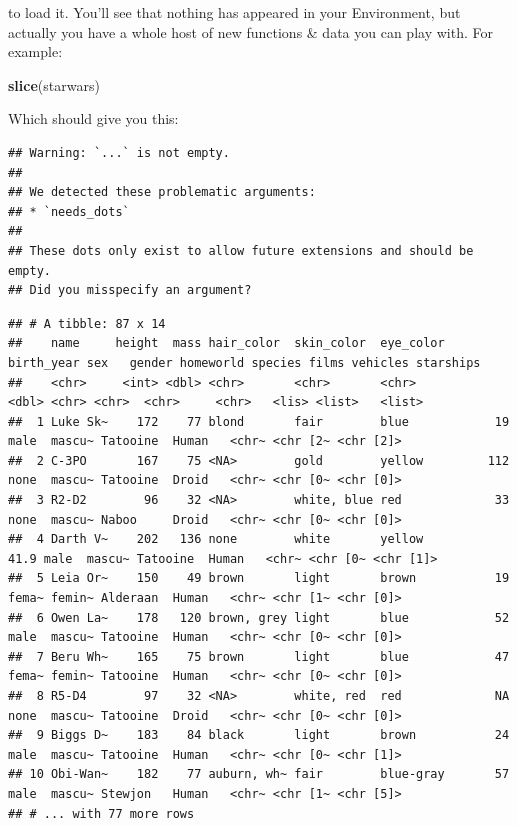 \documentclass[
]{book}
\newenvironment{Shaded}{\begin{snugshade}}{\end{snugshade}}
\newcommand{\KeywordTok}[1]{\textcolor[rgb]{0.13,0.29,0.53}{\textbf{#1}}}
\newcommand{\NormalTok}[1]{#1}
\begin{document}
to load it. You'll see that nothing has appeared in your Environment, but actually you have a whole host of new functions \& data you can play with. For example:

\begin{Shaded}
\begin{Highlighting}[]
\KeywordTok{slice}\NormalTok{(starwars)}
\end{Highlighting}
\end{Shaded}

Which should give you this:

\begin{verbatim}
## Warning: `...` is not empty.
## 
## We detected these problematic arguments:
## * `needs_dots`
## 
## These dots only exist to allow future extensions and should be empty.
## Did you misspecify an argument?
\end{verbatim}

\begin{verbatim}
## # A tibble: 87 x 14
##    name     height  mass hair_color  skin_color  eye_color birth_year sex   gender homeworld species films vehicles starships
##    <chr>     <int> <dbl> <chr>       <chr>       <chr>          <dbl> <chr> <chr>  <chr>     <chr>   <lis> <list>   <list>   
##  1 Luke Sk~    172    77 blond       fair        blue            19   male  mascu~ Tatooine  Human   <chr~ <chr [2~ <chr [2]>
##  2 C-3PO       167    75 <NA>        gold        yellow         112   none  mascu~ Tatooine  Droid   <chr~ <chr [0~ <chr [0]>
##  3 R2-D2        96    32 <NA>        white, blue red             33   none  mascu~ Naboo     Droid   <chr~ <chr [0~ <chr [0]>
##  4 Darth V~    202   136 none        white       yellow          41.9 male  mascu~ Tatooine  Human   <chr~ <chr [0~ <chr [1]>
##  5 Leia Or~    150    49 brown       light       brown           19   fema~ femin~ Alderaan  Human   <chr~ <chr [1~ <chr [0]>
##  6 Owen La~    178   120 brown, grey light       blue            52   male  mascu~ Tatooine  Human   <chr~ <chr [0~ <chr [0]>
##  7 Beru Wh~    165    75 brown       light       blue            47   fema~ femin~ Tatooine  Human   <chr~ <chr [0~ <chr [0]>
##  8 R5-D4        97    32 <NA>        white, red  red             NA   none  mascu~ Tatooine  Droid   <chr~ <chr [0~ <chr [0]>
##  9 Biggs D~    183    84 black       light       brown           24   male  mascu~ Tatooine  Human   <chr~ <chr [0~ <chr [1]>
## 10 Obi-Wan~    182    77 auburn, wh~ fair        blue-gray       57   male  mascu~ Stewjon   Human   <chr~ <chr [1~ <chr [5]>
## # ... with 77 more rows
\end{verbatim}
\end{document}
